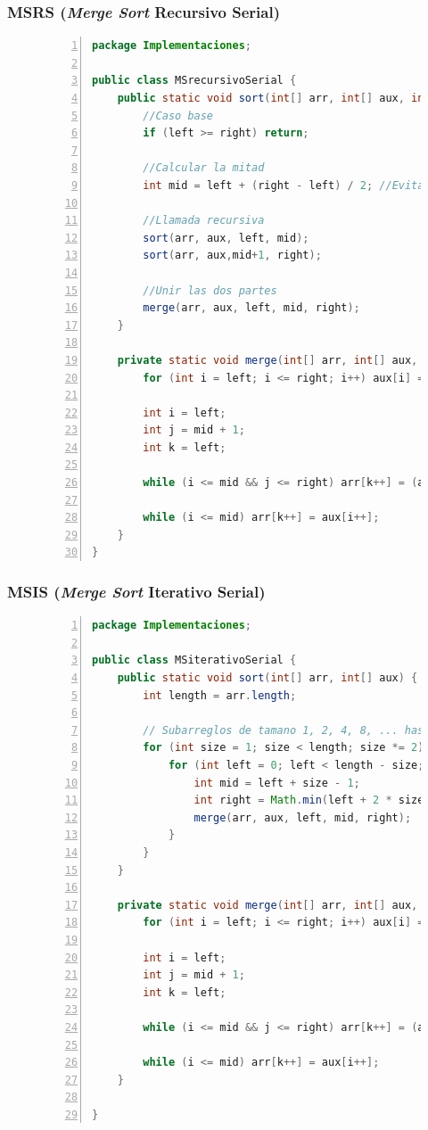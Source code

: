 \documentclass[titlepage]{article}
\begin{document}
\subsubsection{MSRS (\textit{Merge Sort} Recursivo Serial)}
\begin{figure}[h]
	\begin{lstlisting}[language=java, frame=single, numbers=left]
package Implementaciones;

public class MSrecursivoSerial {
	public static void sort(int[] arr, int[] aux, int left, int right) {
		//Caso base
		if (left >= right) return;
		
		//Calcular la mitad
		int mid = left + (right - left) / 2; //Evitar desbordamiento de Integer.MAX_VALUE
		
		//Llamada recursiva
		sort(arr, aux, left, mid);
		sort(arr, aux,mid+1, right);
		
		//Unir las dos partes
		merge(arr, aux, left, mid, right);
	}
	
	private static void merge(int[] arr, int[] aux, int left, int mid, int right) {
		for (int i = left; i <= right; i++) aux[i] = arr[i];
		
		int i = left;       
		int j = mid + 1;    
		int k = left;       
		
		while (i <= mid && j <= right) arr[k++] = (aux[i] <= aux[j])? aux[i++] : aux[j++];
		
		while (i <= mid) arr[k++] = aux[i++];
	}
}
	\end{lstlisting}
\end{figure}


\subsubsection{MSIS (\textit{Merge Sort} Iterativo Serial)}
\begin{figure}
	\begin{lstlisting}[language=java, frame=single, numbers=left]
package Implementaciones;

public class MSiterativoSerial {
	public static void sort(int[] arr, int[] aux) {
		int length = arr.length;
		
		// Subarreglos de tamano 1, 2, 4, 8, ... hasta n/2
		for (int size = 1; size < length; size *= 2) {
			for (int left = 0; left < length - size; left += 2 * size) {
				int mid = left + size - 1;
				int right = Math.min(left + 2 * size - 1, length - 1);
				merge(arr, aux, left, mid, right);
			}
		}
	}
	
	private static void merge(int[] arr, int[] aux, int left, int mid, int right) {
		for (int i = left; i <= right; i++) aux[i] = arr[i];
		
		int i = left;       
		int j = mid + 1;    
		int k = left;       
		
		while (i <= mid && j <= right) arr[k++] = (aux[i] <= aux[j])? aux[i++] : aux[j++];
		
		while (i <= mid) arr[k++] = aux[i++];
	}
	
}
	\end{lstlisting}
\end{figure}
\end{document}
